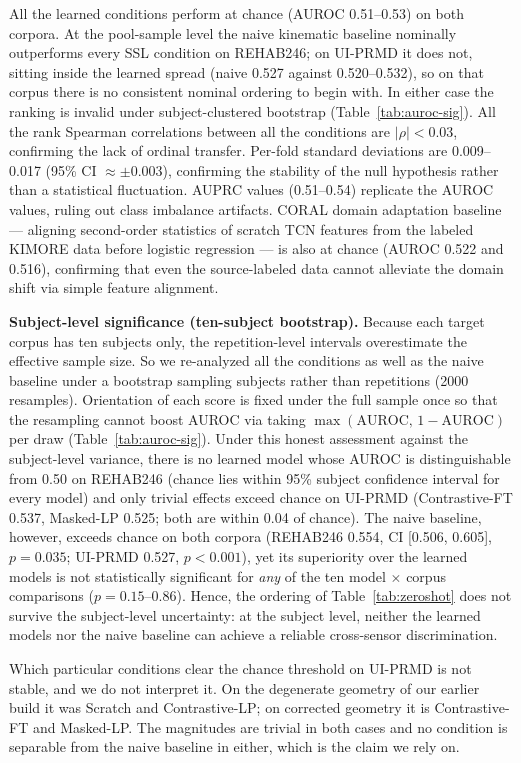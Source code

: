 \documentclass[10pt,journal]{IEEEtran}
\begin{document}
All the learned conditions perform at chance (AUROC 0.51--0.53) on both corpora. At the pool-sample level the naive kinematic baseline nominally outperforms every SSL condition on REHAB246; on UI-PRMD it does not, sitting inside the learned spread (naive 0.527 against 0.520--0.532), so on that corpus there is no consistent nominal ordering to begin with. In either case the ranking is invalid under subject-clustered bootstrap (Table~\ref{tab:auroc-sig}). All the rank Spearman correlations between all the conditions are $|\rho| < 0.03$, confirming the lack of ordinal transfer. Per-fold standard deviations are 0.009--0.017 (95\% CI $\approx \pm 0.003$), confirming the stability of the null hypothesis rather than a statistical fluctuation. AUPRC values (0.51--0.54) replicate the AUROC values, ruling out class imbalance artifacts. CORAL domain adaptation baseline --- aligning second-order statistics of scratch TCN features from the labeled KIMORE data before logistic regression --- is also at chance (AUROC 0.522 and 0.516), confirming that even the source-labeled data cannot alleviate the domain shift via simple feature alignment.

\textbf{Subject-level significance (ten-subject bootstrap).} Because each target corpus has ten subjects only, the repetition-level intervals overestimate the effective sample size. So we re-analyzed all the conditions as well as the naive baseline under a bootstrap sampling subjects rather than repetitions (2000 resamples). Orientation of each score is fixed under the full sample once so that the resampling cannot boost AUROC via taking $\max(\text{AUROC},\,1-\text{AUROC})$ per draw (Table~\ref{tab:auroc-sig}). Under this honest assessment against the subject-level variance, there is no learned model whose AUROC is distinguishable from 0.50 on REHAB246 (chance lies within 95\% subject confidence interval for every model) and only trivial effects exceed chance on UI-PRMD (Contrastive-FT 0.537, Masked-LP 0.525; both are within 0.04 of chance). The naive baseline, however, exceeds chance on both corpora (REHAB246 0.554, CI [0.506, 0.605], $p = 0.035$; UI-PRMD 0.527, $p < 0.001$), yet its superiority over the learned models is not statistically significant for \emph{any} of the ten model $\times$ corpus comparisons ($p = 0.15$--$0.86$). Hence, the ordering of Table~\ref{tab:zeroshot} does not survive the subject-level uncertainty: at the subject level, neither the learned models nor the naive baseline can achieve a reliable cross-sensor discrimination.

Which particular conditions clear the chance threshold on UI-PRMD is not stable, and we do not interpret it. On the degenerate geometry of our earlier build it was Scratch and Contrastive-LP; on corrected geometry it is Contrastive-FT and Masked-LP. The magnitudes are trivial in both cases and no condition is separable from the naive baseline in either, which is the claim we rely on.
\end{document}
